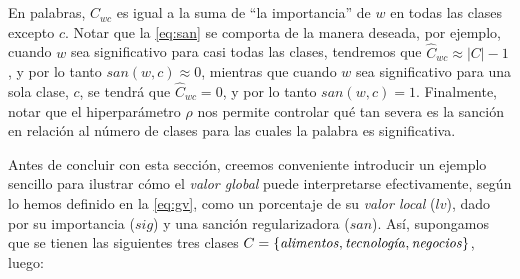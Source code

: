 En palabras, $\hat{C}_{wc}$ es igual a la suma de ``la importancia'' de $w$ en todas las clases excepto $c$.
Notar que la \autoref{eq:san} se comporta de la manera deseada, por ejemplo,
cuando $w$ sea significativo para casi todas las clases, tendremos que $\hat{C}_{wc}\approx |C|-1$, y por lo tanto $san(w, c)\approx 0$, mientras que cuando $w$ sea significativo para una sola clase, $c$, se tendrá que $\hat{C}_{wc} = 0$, y por lo tanto $san(w, c) = 1$.
Finalmente, notar que el hiperparámetro $\rho$ nos permite controlar qué tan severa es la sanción en relación al número de clases para las cuales la palabra es significativa.

\vspace{5mm}

Antes de concluir con esta sección, creemos conveniente introducir un ejemplo sencillo para ilustrar cómo el \emph{valor global} puede interpretarse efectivamente, según lo hemos definido en la \autoref{eq:gv}, como un porcentaje de su \emph{valor local} ($lv$), dado por su importancia ($sig$) y una sanción regularizadora ($san$). Así, supongamos que se tienen las siguientes tres clases $C=\{\text{\emph{alimentos}}, \text{\emph{tecnología}}, \text{\emph{negocios}}\}$, luego:

